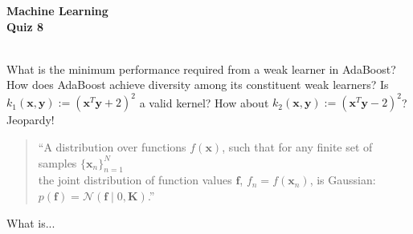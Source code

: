 \documentclass[11pt,noanswers,addpoints]{exam}
\newcommand{\x}{\mathbf x}
\newcommand{\f}{\mathbf f}
\newcommand{\y}{\mathbf y}
\newcommand{\N}{\mathcal N}
\newcommand{\K}{\mathbf K}
\begin{document}
{\Large{\textbf{Machine Learning}}} \\[2mm]
\textbf{\Huge{Quiz 8}}\\



\hfill\hfill{}\\



\begin{questions}


\question[1] What is the minimum performance required from a weak learner in AdaBoost?
\vspace{1cm}
\question[1] How does AdaBoost achieve diversity among its constituent weak learners?
\vspace{1cm}
\question[1] Is $k_1(\x,\y) := (\x^T\y+2)^2$ a valid kernel?
\question[1] How about $k_2(\x,\y) := (\x^T\y-2)^2$?
\question[1] Jeopardy!\begin{quote}``A distribution over functions $f(\x)$, such that for any finite set of samples $\{\x_n\}_{n=1}^N$\\[2mm] the joint distribution of function values $\f$, $f_n=f(\x_n)$, is Gaussian: $p(\f)=\N(\f\mid 0,\K)$.''\end{quote}
What is$...$
\end{questions}
\end{document}
